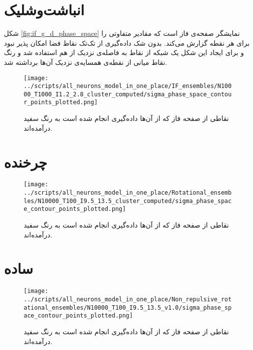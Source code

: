 \section{انباشت‌وشلیک} \label{appendix:phase_sampling_if}
شکل \ref{fig:if_g_d_phase_space} نمایشگر صفحه‌ی فاز است که مقادیر متفاوتی را برای هر نقطه گزارش می‌کند. بدون شک داده‌گیری از تک‌تک نقاط فضا امکان پذیر نبود و برای ایجاد این شکل یک شبکه از نقاط به فاصله‌ی نزدیک از هم استفاده شد و رنگ نقاط میانی از نقطه‌ی همسایه‌ی نزدیک آن‌ها برداشته شد.
\begin{figure}[h]
	\texttt{[image: ../scripts/all\_neurons\_model\_in\_one\_place/IF\_ensembles/N10000\_T1000\_I1.2\_2.8\_cluster\_computed/sigma\_phase\_space\_contour\_points\_plotted.png]}
	\caption{نقاطی از صفحه فاز که از آن‌ها داده‌گیری انجام شده است به رنگ سفید درآمده‌اند.}
	\label{fig:if_g_d_phase_if_space_points_plotted}
\end{figure}

\section{چرخنده} \label{appendix:phase_samplingـrotational}
\begin{figure}[h]
	\texttt{[image: ../scripts/all\_neurons\_model\_in\_one\_place/Rotational\_ensembles/N10000\_T100\_I9.5\_13.5\_cluster\_computed/sigma\_phase\_space\_contour\_points\_plotted.png]}
	\caption{نقاطی از صفحه فاز که از آن‌ها داده‌گیری انجام شده است به رنگ سفید درآمده‌اند.}
	\label{fig:if_g_d_phase_rotational_space_points_plotted}
\end{figure}

\section{ساده} \label{appendix:phase_sampling_simple}
\begin{figure}[h]
	\texttt{[image: ../scripts/all\_neurons\_model\_in\_one\_place/Non\_repulsive\_rotational\_ensembles/N10000\_T100\_I9.5\_13.5\_v1.0/sigma\_phase\_space\_contour\_points\_plotted.png]}
	\caption{نقاطی از صفحه فاز که از آن‌ها داده‌گیری انجام شده است به رنگ سفید درآمده‌اند.}
	\label{fig:if_g_d_phase_space_Non_repulsive_points_plotted}
\end{figure}